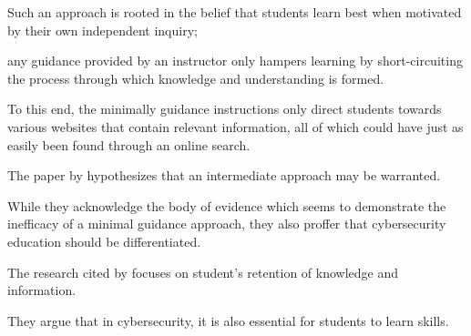 Such an approach is rooted in the belief that students learn best when motivated by their own independent inquiry; %







any guidance provided by an instructor only hampers learning by short-circuiting the process through which knowledge and understanding is formed. 















        To this end, the minimally guidance instructions only direct students towards various websites that contain relevant information, all of which could have just as easily been found through an online search. 






















        The paper by \textcite{R-Weiss} hypothesizes that an intermediate approach may be warranted. %







While they acknowledge the body of evidence which seems to demonstrate the inefficacy of a minimal guidance approach, they also proffer that cybersecurity education should be differentiated. %







The research cited by \citeauthor{J-Sweller} focuses on student's retention of knowledge and information. %







They argue that in cybersecurity, it is also essential for students to learn skills. %







